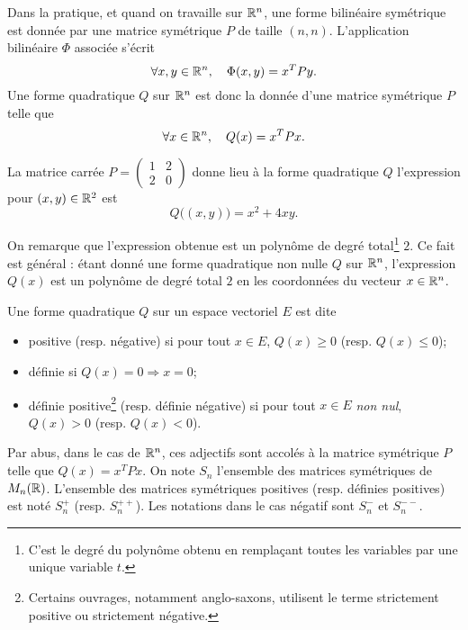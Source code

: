 \documentclass[11pt, a4paper]{article}
\begin{document}
Dans la pratique, et quand on travaille sur $\mathbb{R}^n$, une forme
bilinéaire symétrique est donnée par une matrice symétrique $P$ de
taille $(n, n)$. L'application bilinéaire $\Phi$ associée s'écrit
\[
\forall x, y \in \mathbb{R}^n, \quad \Phi(x, y) = x^TPy.
\]
Une forme quadratique $Q$ sur $\mathbb{R}^n$ est donc la donnée d'une matrice
symétrique $P$ telle que 
\[
\forall x \in \mathbb{R}^n, \quad Q(x) = x^TPx.
\]
\begin{exmp}
  La matrice carrée $P = \begin{pmatrix} 1 & 2 \\ 2 & 0 \end{pmatrix}$
  donne lieu à la forme quadratique $Q$ l'expression
  pour $(x, y) \in \mathbb{R}^2$ est
  \[
  Q\big((x, y)\big) = x^2 + 4xy.
  \]
\end{exmp}
\noindent On remarque que l'expression obtenue est un polynôme de degré
total\footnote{C'est le degré du polynôme obtenu en rempla\c{c}ant
  toutes les variables par une unique variable $t$.} $2$. Ce fait est
général : étant donné une forme quadratique non nulle $Q$ sur $\mathbb{R}^n$,
l'expression $Q(x)$ est un polynôme de degré total $2$ en les
coordonnées du vecteur $x \in \mathbb{R}^n$. 
\begin{defn}
  Une forme quadratique $Q$ sur un espace vectoriel $E$ est dite
  \begin{itemize}
  \item[\textbullet] positive (resp. négative) si pour tout
    $x \in E$, $Q(x) \geq 0$ (resp. $Q(x) \leq 0$);
  \item[\textbullet] définie si $Q(x) = 0 \Rightarrow x = 0$;
  \item[\textbullet] définie positive\footnote{Certains ouvrages,
      notamment anglo-saxons, utilisent le terme strictement positive
      ou strictement négative.} (resp. définie négative) si pour tout
    $x \in E$ \emph{non nul}, $Q(x) > 0$ (resp. $Q(x) < 0$).
  \end{itemize}
\end{defn}
\noindent Par abus, dans le cas de $\mathbb{R}^n$, ces adjectifs sont accolés
à la matrice symétrique $P$ telle que $Q(x) = x^TPx$. On note $S_n$
l'ensemble des matrices symétriques de $M_n(\mathbb{R})$. L'ensemble des matrices
symétriques positives (resp. définies positives) est noté $S_n^+$
(resp. $S_n^{++}$). Les notations dans le cas négatif sont $S_n^{-}$
et $S_n^{--}$.
\end{document}
